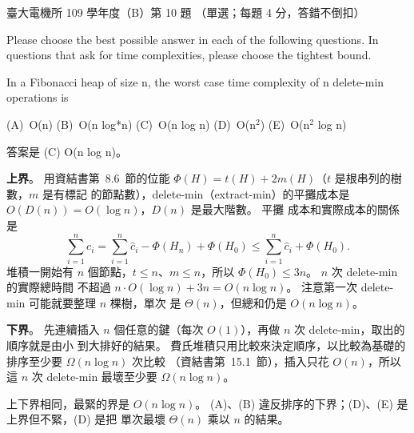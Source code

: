 \begin{pastexam}[label={px:ntu-109-ee-ds-10}]{臺大電機所 109 學年度（B）第 10 題}
（單選；每題 4 分，答錯不倒扣）

Please choose the best possible answer in each of the following questions. In questions that ask
for time complexities, please choose the tightest bound.

In a Fibonacci heap of size n, the worst case time complexity of n delete-min operations is

(A)~O(n) \qquad (B)~O(n log*n) \qquad (C)~O(n log n) \qquad (D)~O(n$^2$) \qquad (E)~O(n$^2$ log n)
\end{pastexam}

\begin{pastsoln}
答案是 (C) O(n log n)。

\textbf{上界}。 用資結書第~8.6~節的位能 $\Phi(H) = t(H) + 2m(H)$（$t$ 是根串列的樹數，$m$ 是有標記
的節點數），delete-min（extract-min）的平攤成本是 $O(D(n)) = O(\log n)$，$D(n)$ 是最大階數。 平攤
成本和實際成本的關係是
\[
\sum_{i=1}^{n} c_i = \sum_{i=1}^{n} \hat c_i - \Phi(H_n) + \Phi(H_0) \le \sum_{i=1}^{n} \hat c_i + \Phi(H_0).
\]
堆積一開始有 $n$ 個節點，$t \le n$、$m \le n$，所以 $\Phi(H_0) \le 3n$。 $n$ 次 delete-min 的實際總時間
不超過 $n \cdot O(\log n) + 3n = O(n \log n)$。 注意第一次 delete-min 可能就要整理 $n$ 棵樹，單次
是 $\Theta(n)$，但總和仍是 $O(n \log n)$。

\textbf{下界}。 先連續插入 $n$ 個任意的鍵（每次 $O(1)$），再做 $n$ 次 delete-min，取出的順序就是由小
到大排好的結果。 費氏堆積只用比較來決定順序，以比較為基礎的排序至少要 $\Omega(n \log n)$ 次比較
（資結書第~15.1~節），插入只花 $O(n)$，所以這 $n$ 次 delete-min 最壞至少要 $\Omega(n \log n)$。

上下界相同，最緊的界是 $O(n \log n)$。 (A)、(B) 違反排序的下界；(D)、(E) 是上界但不緊，(D) 是把
單次最壞 $\Theta(n)$ 乘以 $n$ 的結果。
\end{pastsoln}
